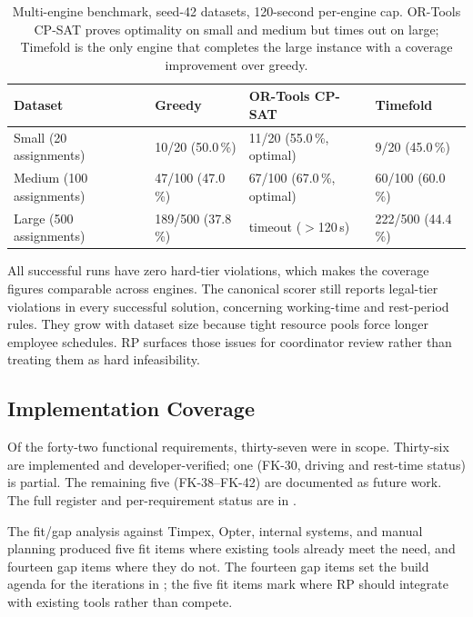 \begin{table}[h]
\centering
\caption{Multi-engine benchmark, seed-42 datasets, 120-second per-engine cap. OR-Tools CP-SAT proves optimality on small and medium but times out on large; Timefold is the only engine that completes the large instance with a coverage improvement over greedy.}
\label{tab:benchmark-results}
\small
\begin{tabular}{llll}
\toprule
\textbf{Dataset} & \textbf{Greedy} & \textbf{OR-Tools CP-SAT} & \textbf{Timefold} \\
\midrule
Small  (20 assignments)  & 10/20 (50.0\,\%)   & 11/20 (55.0\,\%, optimal)   & 9/20 (45.0\,\%) \\
\midrule
Medium (100 assignments) & 47/100 (47.0\,\%)  & 67/100 (67.0\,\%, optimal)  & 60/100 (60.0\,\%) \\
\midrule
Large  (500 assignments) & 189/500 (37.8\,\%) & timeout ($>$120\,s)         & 222/500 (44.4\,\%) \\
\bottomrule
\end{tabular}
\end{table}

All successful runs have zero hard-tier violations, which makes the coverage figures comparable across engines. The canonical scorer still reports legal-tier violations in every successful solution, concerning working-time and rest-period rules. They grow with dataset size because tight resource pools force longer employee schedules. RP surfaces those issues for coordinator review rather than treating them as hard infeasibility.

\subsection{Implementation Coverage}
\label{sec:implementation-coverage}

Of the forty-two functional requirements, thirty-seven were in scope. Thirty-six are implemented and developer-verified; one (FK-30, driving and rest-time status) is partial. The remaining five (FK-38--FK-42) are documented as future work. The full register and per-requirement status are in .

The fit/gap analysis against Timpex, Opter, internal systems, and manual planning produced five fit items where existing tools already meet the need, and fourteen gap items where they do not. The fourteen gap items set the build agenda for the iterations in ; the five fit items mark where RP should integrate with existing tools rather than compete.

